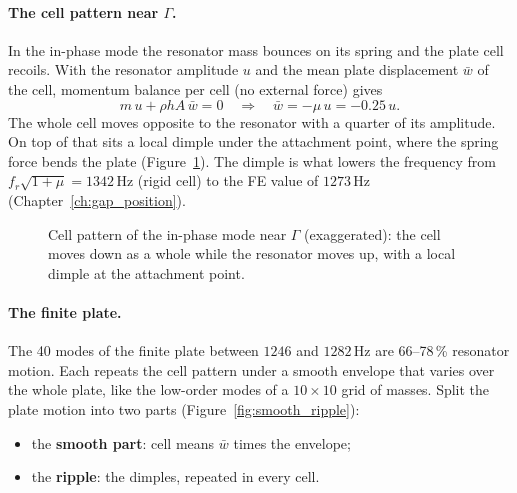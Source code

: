 \paragraph{The cell pattern near $\Gamma$.}
In the in-phase mode the resonator mass bounces on its spring and the plate cell
recoils. With the resonator amplitude $u$ and the mean plate displacement
$\bar w$ of the cell, momentum balance per cell (no external force) gives
\begin{equation}
  m\,u + \rho h A\, \bar w = 0
  \quad\Longrightarrow\quad
  \bar w = -\mu\, u = -0.25\,u .
\end{equation}
The whole cell moves opposite to the resonator with a quarter of its amplitude. On
top of that sits a local dimple under the attachment point, where the spring force
bends the plate (Figure~\ref{fig:cell_pattern}). The dimple is what lowers the
frequency from $f_r\sqrt{1+\mu} = 1342\,\mathrm{Hz}$ (rigid cell) to the FE value
of $1273\,\mathrm{Hz}$ (Chapter~\ref{ch:gap_position}).

\begin{figure}[htbp]
\centering
{}
\caption{Cell pattern of the in-phase mode near $\Gamma$ (exaggerated): the cell
moves down as a whole while the resonator moves up, with a local dimple at the
attachment point.}
\label{fig:cell_pattern}
\end{figure}

\paragraph{The finite plate.}
The 40 modes of the finite plate between $1246$ and $1282\,\mathrm{Hz}$ are
66--78\,\% resonator motion. Each repeats the cell pattern under a smooth envelope
that varies over the whole plate, like the low-order modes of a $10 \times 10$ grid
of masses. Split the plate motion into two parts (Figure~\ref{fig:smooth_ripple}):
\begin{itemize}
  \item the \textbf{smooth part}: cell means $\bar w$ times the envelope;
  \item the \textbf{ripple}: the dimples, repeated in every cell.
\end{itemize}

